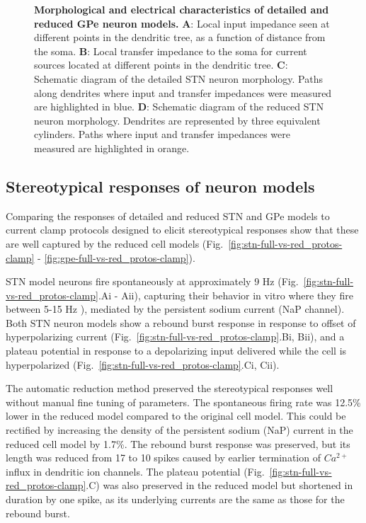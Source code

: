\begin{figure}[ht]
\caption{
\textbf{Morphological and electrical characteristics of detailed and reduced GPe neuron models.}
\textbf{A}: Local input impedance seen at different points in the dendritic tree, as a function
of distance from the soma.
\textbf{B}: Local transfer impedance to the soma for current sources located at different points
in the dendritic tree.
\textbf{C}: Schematic diagram of the detailed STN neuron morphology. Paths along dendrites where
input and transfer impedances were measured are highlighted in blue.
\textbf{D}: Schematic diagram of the reduced STN neuron morphology. Dendrites are represented by
three equivalent cylinders. Paths where input and transfer impedances were measured are highlighted
in orange.
}
\label{fig:gpe-full-vs-red_Zin-Ztr}
\end{figure}

%
%
%
\subsection{Stereotypical responses of neuron models}
%
%
%
%
%
%
%
%
%

%
%
%

%
%
%

%
%
%
%
%
%
%
%
%
%
%

Comparing the responses of detailed and reduced STN and GPe models to current
clamp protocols designed to elicit stereotypical responses show that these
are well captured by the reduced cell models (Fig.~\ref{fig:stn-full-vs-red_protos-clamp} - \ref{fig:gpe-full-vs-red_protos-clamp}).

%
%
%
%
%
%
%
%
%
%
%
%
%
%
%
%
%
STN model neurons fire spontaneously at approximately 9 Hz (Fig.~\ref{fig:stn-full-vs-red_protos-clamp}.Ai - Aii), capturing their
behavior in vitro where they fire between 5-15 Hz \cite{gillies_membrane_2005}),
mediated by the persistent sodium current (NaP channel).
Both STN neuron models show a rebound burst response in response to offset of
hyperpolarizing current (Fig.~\ref{fig:stn-full-vs-red_protos-clamp}.Bi, Bii),
and a plateau potential in response to a depolarizing input delivered while the
cell is hyperpolarized (Fig.~\ref{fig:stn-full-vs-red_protos-clamp}.Ci, Cii).
%
%
%

%

%
The automatic reduction method preserved the stereotypical responses well without
manual fine tuning of parameters. The spontaneous firing rate was 12.5\% lower in the
reduced model compared to the original cell model. This could be rectified by increasing
the density of the persistent sodium (NaP) current in the reduced cell model by 1.7\%.
The rebound burst response was preserved, but its length was reduced from 17 to 10 spikes
caused by earlier termination of $Ca^{2+}$ influx in dendritic ion channels.
%
%
%
%
The plateau potential (Fig.~\ref{fig:stn-full-vs-red_protos-clamp}.C) was also preserved
in the reduced model but shortened in duration by one spike, as its underlying
currents are the same as those for the rebound burst.
%
%
%

